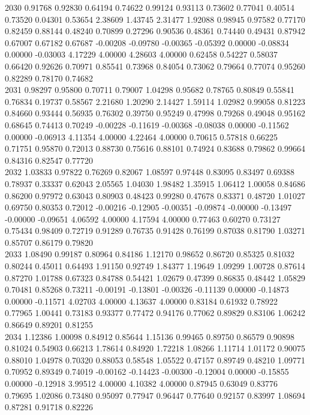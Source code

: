 {2030 0.91768 0.92830 0.64194 0.74622 0.99124 0.93113 0.73602 0.77041 0.40514 0.73520 0.04301 0.53654 2.38609 1.43745 2.31477 1.92088 0.98945 0.97582 0.77170 0.82459 0.88144 0.48240 0.70899 0.27296 0.90536 0.48361 0.74440 0.49431 0.87942 0.67007 0.67182 0.67687 -0.00208 -0.09780 -0.00365 -0.05392 0.00000 -0.08834 0.00000 -0.03003 4.17229 4.00000 4.28603 4.00000 0.62458 0.54227 0.58037 0.66420 0.92626 0.70971 0.85541 0.73968 0.84054 0.73062 0.79664 0.77074 0.95260 0.82289 0.78170 0.74682 \\
2031 0.98297 0.95800 0.70711 0.79007 1.04298 0.95682 0.78765 0.80849 0.55841 0.76834 0.19737 0.58567 2.21680 1.20290 2.14427 1.59114 1.02982 0.99058 0.81223 0.84660 0.93444 0.56935 0.76302 0.39750 0.95249 0.47998 0.79268 0.49048 0.95162 0.68645 0.74413 0.70249 -0.00228 -0.11619 -0.00368 -0.08038 0.00000 -0.11562 0.00000 -0.06913 4.11354 4.00000 4.22464 4.00000 0.70615 0.57818 0.66225 0.71751 0.95870 0.72013 0.88730 0.75616 0.88101 0.74924 0.83688 0.79862 0.99664 0.84316 0.82547 0.77720 \\
2032 1.03833 0.97822 0.76269 0.82067 1.08597 0.97448 0.83095 0.83497 0.69388 0.78937 0.33337 0.62043 2.05565 1.04030 1.98482 1.35915 1.06412 1.00058 0.84686 0.86200 0.97972 0.63043 0.80903 0.48423 0.99280 0.47678 0.83371 0.48720 1.01027 0.69750 0.80353 0.72012 -0.00216 -0.12905 -0.00351 -0.09874 -0.00000 -0.13497 -0.00000 -0.09651 4.06592 4.00000 4.17594 4.00000 0.77463 0.60270 0.73127 0.75434 0.98409 0.72719 0.91289 0.76735 0.91428 0.76199 0.87038 0.81790 1.03271 0.85707 0.86179 0.79820 \\
2033 1.08490 0.99187 0.80964 0.84186 1.12170 0.98652 0.86720 0.85325 0.81032 0.80244 0.45011 0.64493 1.91150 0.92749 1.84377 1.19649 1.09299 1.00728 0.87614 0.87270 1.01788 0.67323 0.84788 0.54421 1.02679 0.47399 0.86835 0.48442 1.05829 0.70481 0.85268 0.73211 -0.00191 -0.13801 -0.00326 -0.11139 0.00000 -0.14873 0.00000 -0.11571 4.02703 4.00000 4.13637 4.00000 0.83184 0.61932 0.78922 0.77965 1.00441 0.73183 0.93377 0.77472 0.94176 0.77062 0.89829 0.83106 1.06242 0.86649 0.89201 0.81255 \\
2034 1.12386 1.00098 0.84912 0.85644 1.15136 0.99465 0.89750 0.86579 0.90898 0.81024 0.54903 0.66213 1.78614 0.84920 1.72218 1.08266 1.11714 1.01172 0.90075 0.88010 1.04978 0.70320 0.88053 0.58548 1.05522 0.47157 0.89749 0.48210 1.09771 0.70952 0.89349 0.74019 -0.00162 -0.14423 -0.00300 -0.12004 0.00000 -0.15855 0.00000 -0.12918 3.99512 4.00000 4.10382 4.00000 0.87945 0.63049 0.83776 0.79695 1.02086 0.73480 0.95097 0.77947 0.96447 0.77640 0.92157 0.83997 1.08694 0.87281 0.91718 0.82226 \\
}
